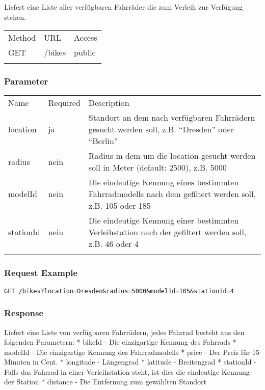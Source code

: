 Liefert eine Liste aller verfügbaren Fahrräder die zum Verleih zur
Verfügung stehen.

\begin{longtable}[c]{@{}lll@{}}
\toprule\addlinespace
Method & URL & Access
\\\addlinespace
\midrule\endhead
GET & /bikes & public
\\\addlinespace
\bottomrule
\end{longtable}

\subsubsection{Parameter}\label{parameter}

\begin{longtable}[c]{@{}lll@{}}
\toprule\addlinespace
Name & Required & Description
\\\addlinespace
\midrule\endhead
location & ja & Standort an dem nach verfügbaren Fahrrädern gesucht
werden soll, z.B. ``Dresden'' oder ``Berlin''
\\\addlinespace
radius & nein & Radius in dem um die location gesucht werden soll in
Meter (default: 2500), z.B. 5000
\\\addlinespace
modelId & nein & Die eindeutige Kennung eines bestimmten Fahrradmodells
nach dem gefiltert werden soll, z.B. 105 oder 185
\\\addlinespace
stationId & nein & Die eindeutige Kennung einer bestimmten
Verleihstation nach der gefiltert werden soll, z.B. 46 oder 4
\\\addlinespace
\bottomrule
\end{longtable}

\subsubsection{Request Example}\label{request-example}

\begin{verbatim}
GET /bikes?location=Dresden&radius=5000&modelId=105&stationId=4
\end{verbatim}

\subsubsection{Response}\label{response}

Liefert eine Liste von verfügbaren Fahrrädern, jedes Fahrrad besteht aus
den folgenden Parametern: * bikeId - Die einzigartige Kennung des
Fahrrads * modelId - Die einzigartige Kennung des Fahrradmodells * price
- Der Preis für 15 Minuten in Cent. * longitude - Längengrad * latitude
- Breitengrad * stationId - Falls das Fahrrad in einer Verleihstation
steht, ist dies die eindeutige Kennung der Station * distance - Die
Entfernung zum gewählten Standort

